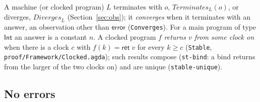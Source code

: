 \documentclass[10pt]{article}
\theoremstyle{acmplain}
\newcommand{\key}[1]{\mathsf{#1}}
\newcommand{\error}{\key{error}}
\newcommand{\Term}{\mathit{Terminates}}
\newcommand{\Div}{\mathit{Diverges}}
\newcommand{\Ret}{\key{ret}\;}
\begin{document}
A machine (or clocked program) $L$ terminates with $o$, $\Term_L(o)$, or
diverges, $\Div_L$ (Section~\ref{sec:obs}); it \emph{converges} when it
terminates with an answer, an observation other than $\error$
(\texttt{Converges}). For a main program of type $\key{Int}$ an answer is a
constant $n$. A clocked program $f$ \emph{returns $v$ from some clock on}
when there is a clock $c$ with $f(k) = \Ret v$ for every $k \geq c$
(\texttt{Stable}, \texttt{proof/Framework/Clocked.agda}); such results
compose (\texttt{st-bind}: a bind returns from the larger of the two
clocks on) and are unique (\texttt{stable-unique}).

\subsection{No errors}
\end{document}
